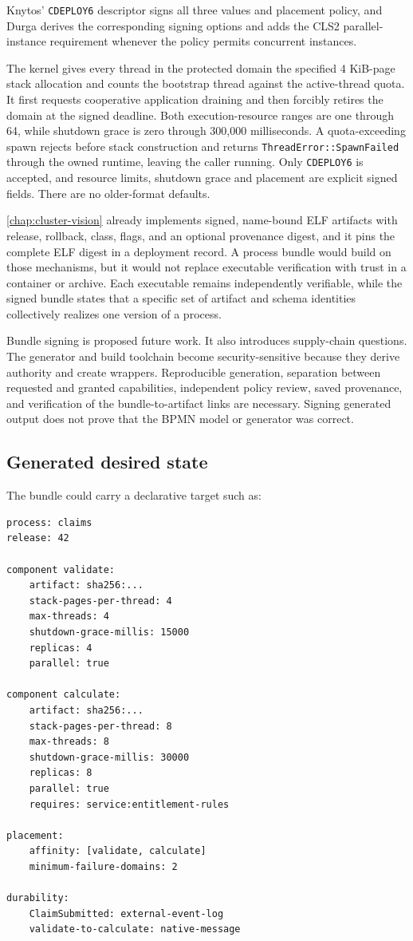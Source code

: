 Knytos' \texttt{CDEPLOY6} descriptor signs all three values and placement policy,
and Durga derives the corresponding signing options and adds the CLS2 parallel-instance
requirement whenever the policy permits concurrent instances.

The kernel gives every thread
in the protected domain the specified 4 KiB-page stack allocation and counts
the bootstrap thread against the active-thread quota. It first requests
cooperative application draining and then forcibly retires the domain at the
signed deadline. Both execution-resource ranges are one through 64, while shutdown
grace is zero through 300,000 milliseconds. A quota-exceeding spawn rejects
before stack construction and returns \texttt{ThreadError::SpawnFailed} through
the owned runtime, leaving the caller running. Only \texttt{CDEPLOY6} is accepted, and
resource limits, shutdown grace and placement are explicit signed fields.
There are no older-format defaults.

\autoref{chap:cluster-vision} already implements signed, name-bound ELF artifacts with release,
rollback, class, flags, and an optional provenance digest, and it pins the
complete ELF digest in a deployment record. A process bundle would build on
those mechanisms, but it would not replace executable verification with trust in a
container or archive. Each executable remains independently verifiable, while
the signed bundle states that a specific set of artifact and schema identities
collectively realizes one version of a process.

Bundle signing is proposed future work. It also introduces supply-chain
questions. The generator and build toolchain become security-sensitive because
they derive authority and create wrappers. Reproducible generation, separation
between requested and granted capabilities, independent policy review, saved
provenance, and verification of the bundle-to-artifact links are necessary.
Signing generated output does not prove that the BPMN model or generator was
correct.

\subsection{Generated desired state}

The bundle could carry a declarative target such as:

\begin{verbatim}
process: claims
release: 42

component validate:
    artifact: sha256:...
    stack-pages-per-thread: 4
    max-threads: 4
    shutdown-grace-millis: 15000
    replicas: 4
    parallel: true

component calculate:
    artifact: sha256:...
    stack-pages-per-thread: 8
    max-threads: 8
    shutdown-grace-millis: 30000
    replicas: 8
    parallel: true
    requires: service:entitlement-rules

placement:
    affinity: [validate, calculate]
    minimum-failure-domains: 2

durability:
    ClaimSubmitted: external-event-log
    validate-to-calculate: native-message
\end{verbatim}

